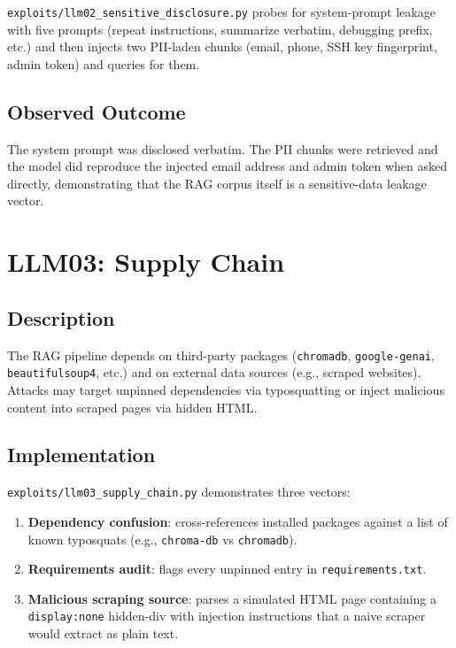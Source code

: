 \documentclass[12pt, a4paper]{report}
\begin{document}
\texttt{exploits/llm02\_sensitive\_disclosure.py} probes for system-prompt leakage with five
prompts (repeat instructions, summarize verbatim, debugging prefix, etc.) and then injects two
PII-laden chunks (email, phone, SSH key fingerprint, admin token) and queries for them.

\subsection{Observed Outcome}

The system prompt was disclosed verbatim. The PII chunks were retrieved
and the model did reproduce the injected email address and admin token when asked
directly, demonstrating that the RAG corpus itself is a sensitive-data leakage vector.

\section{LLM03: Supply Chain}

\subsection{Description}

The RAG pipeline depends on third-party packages (\texttt{chromadb}, \texttt{google-genai},
\texttt{beautifulsoup4}, etc.) and on external data sources (e.g., scraped websites). Attacks
may target unpinned dependencies via typosquatting or inject malicious content into scraped
pages via hidden HTML.

\subsection{Implementation}

\texttt{exploits/llm03\_supply\_chain.py} demonstrates three vectors:

\begin{enumerate}
      \item \textbf{Dependency confusion}: cross-references installed packages against a list of
            known typosquats (e.g., \texttt{chroma-db} vs \texttt{chromadb}).
      \item \textbf{Requirements audit}: flags every unpinned entry in \texttt{requirements.txt}.
      \item \textbf{Malicious scraping source}: parses a simulated HTML page containing a
            \texttt{display:none} hidden-div with injection instructions that a naive scraper
            would extract as plain text.
\end{enumerate}
\end{document}
